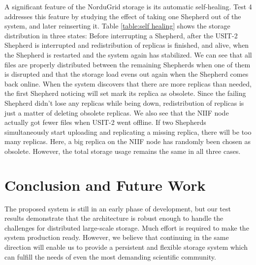 \documentclass[final]{ieee}
\begin{document}
A significant feature of the NorduGrid storage is its automatic self-healing. Test 4 addresses this feature by studying the effect of
taking one Shepherd out of the system, and later reinserting it. Table
\ref{table:self healing} shows the storage distribution in three
states: Before interrupting a Shepherd, after the USIT-2
Shepherd is interrupted and redistribution of replicas is finished, and
alive, when the Shepherd is restarted and the system again has stabilized. We
can see that all files are properly distributed between the remaining
Shepherds when one of them is disrupted and that the storage load evens out 
again when the Shepherd comes back online. When the
system discovers that there are more replicas than needed, the first
Shepherd noticing will set mark its replica as obsolete. Since the failing Shepherd didn't lose any replicas while
being down, redistribution of replicas is just a matter of deleting
obsolete replicas. We also see that the NIIF node actually got fewer
files when USIT-2 went offline. If two Shepherds simultaneously
start uploading and replicating a missing replica, there will be too many
replicas. Here, a big replica on the NIIF node has randomly been chosen as
obsolete. However, the total storage usage remains the same in all
three cases.

\section{Conclusion and Future Work}
\label{Conclusion and Future Work}

The proposed system is still in an early phase of development, but our test
results demonstrate that the architecture is robust enough to handle
the challenges for distributed large-scale storage. Much
effort is required to make the system production
ready. However, we believe that continuing in the same direction
will enable us to provide a persistent  and flexible storage system
which can fulfill the needs of even the most demanding scientific community. 
\end{document}

